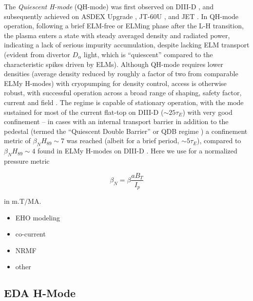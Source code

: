The \emph{Quiescent H-mode} (QH-mode) was first observed on DIII-D \cite{Burrell2002,Groebner2001}, and subsequently achieved on ASDEX Upgrade \cite{Suttrop2003a}, JT-60U \cite{Sakamoto2004}, and JET \cite{Suttrop2005}.  In QH-mode operation, following a brief ELM-free or ELMing phase after the L-H transition, the plasma enters a state with steady averaged density and radiated power, indicating a lack of serious impurity accumulation, despite lacking ELM transport (evident from divertor $D_\alpha$ light, which is ``quiescent'' compared to the characteristic spikes driven by ELMs).  Although QH-mode requires lower densities (average density reduced by roughly a factor of two from comparable ELMy H-modes) with cryopumping for density control, access is otherwise robust, with successful operation across a broad range of shaping, safety factor, current and field \cite{Burrell2002}.  The regime is capable of stationary operation, with the mode sustained for most of the current flat-top on DIII-D ($\sim 25 \tau_E$) with very good confinement -- in cases with an internal transport barrier in addition to the pedestal (termed the ``Quiescent Double Barrier'' or QDB regime \cite{Burrell2001,Doyle2001,Greenfield2002}) a confinement metric of $\beta_N H_{89} \sim 7$ was reached (albeit for a brief period, $\sim 5 \tau_E$), compared to $\beta_N H_{89} \sim 4$ found in ELMy H-modes on DIII-D \cite{Doyle2001}.  Here we use for a normalized pressure metric

\begin{equation}\label{eq:betan}
 \beta_N = \beta \frac{aB_T}{I_p}
\end{equation}

\noindent in $\si{\meter.\tesla\per\mega\ampere}$.

\begin{itemize}
 \item EHO modeling \cite{Snyder2007,Osborne2008}
 \item co-current \cite{Burrell2009}
 \item NRMF \cite{Garofalo2011,Burrell2013}
 \item other \cite{Oyama2006,Groebner2001}
\end{itemize}

\subsection{EDA H-Mode}\label{subsec:hcr_eda}

\nicesectionending

